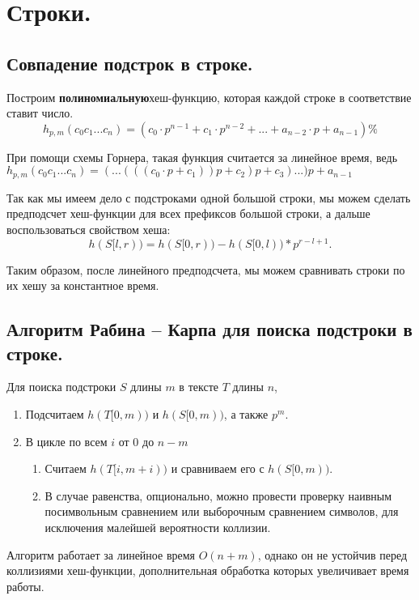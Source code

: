 \section{Строки.}%


\subsection{Совпадение подстрок в строке.}%

Построим \textbf{полиномиальную}хеш-функцию, которая каждой строке в соответствие ставит число.
\[h_{p, m}(c_{0}c_{1}...c_{n}) = (c_0 \cdot p^{n - 1} + c_1 \cdot p^{n-2} + ... + a_{n - 2} \cdot p + a_{n - 1}) \% \]

При помощи схемы Горнера, такая функция считается за линейное время, ведь $h_{p, m}(c_{0}c_{1}...c_{n}) = (...(((c_0 \cdot p + c_1))p + c_2)p + c_3)...)p + a_{n-1}$

Так как мы имеем дело с подстроками одной большой строки, мы можем сделать предподсчет хеш-функции для всех префиксов большой строки, а дальше воспользоваться свойством хеша:
\[
	h(S[l, r)) = h(S[0, r)) - h(S[0, l))*p^{r - l + 1}
.\] 

Таким образом, после линейного предподсчета, мы можем сравнивать строки по их хешу за константное время.


\subsection{Алгоритм Рабина -- Карпа для поиска подстроки в строке.}%

Для поиска подстроки $S$ длины $m$ в тексте $T$ длины $n$, 
\begin{enumerate}
	\item Подсчитаем $h(T[0, m))$ и $h(S[0, m))$, а также $p^m$.
	\item В цикле по всем $i$ от  $0$ до $n - m$
		\begin{enumerate}
			\item Считаем $h(T[i, m + i))$ и сравниваем его с $h(S[0, m))$. 
			\item В случае равенства, опционально, можно провести проверку наивным посимвольным сравнением или выборочным сравнением символов, для исключения малейшей вероятности коллизии.
		\end{enumerate}
\end{enumerate}

Алгоритм работает за линейное время $O(n + m)$, однако он не устойчив перед коллизиями хеш-функции, дополнительная обработка которых увеличивает время работы.


